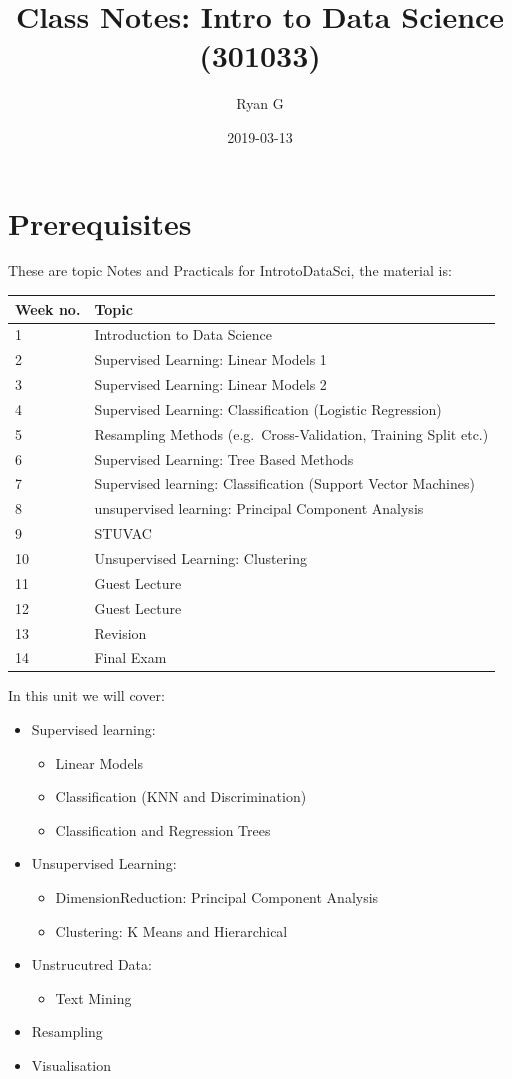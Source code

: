 \documentclass[]{book}
\title{Class Notes: Intro to Data Science (301033)}
\author{Ryan G}
\date{2019-03-13}
\providecommand{\tightlist}{%
  \setlength{\itemsep}{0pt}\setlength{\parskip}{0pt}}
\begin{document}
\maketitle

{
\setcounter{tocdepth}{1}
\tableofcontents
}
\chapter{Prerequisites}\label{prerequisites}

These are topic Notes and Practicals for IntrotoDataSci, the material
is:

\begin{longtable}[]{@{}ll@{}}
\toprule
Week no. & Topic\tabularnewline
\midrule
\endhead
1 & Introduction to Data Science\tabularnewline
2 & Supervised Learning: Linear Models 1\tabularnewline
3 & Supervised Learning: Linear Models 2\tabularnewline
4 & Supervised Learning: Classification (Logistic
Regression)\tabularnewline
5 & Resampling Methods (e.g.~Cross-Validation, Training Split
etc.)\tabularnewline
6 & Supervised Learning: Tree Based Methods\tabularnewline
7 & Supervised learning: Classification (Support Vector
Machines)\tabularnewline
8 & unsupervised learning: Principal Component Analysis\tabularnewline
9 & STUVAC\tabularnewline
10 & Unsupervised Learning: Clustering\tabularnewline
11 & Guest Lecture\tabularnewline
12 & Guest Lecture\tabularnewline
13 & Revision\tabularnewline
14 & Final Exam\tabularnewline
\bottomrule
\end{longtable}

In this unit we will cover:

\begin{itemize}
\tightlist
\item
  Supervised learning:

  \begin{itemize}
  \tightlist
  \item
    Linear Models
  \item
    Classification (KNN and Discrimination)
  \item
    Classification and Regression Trees
  \end{itemize}
\item
  Unsupervised Learning:

  \begin{itemize}
  \tightlist
  \item
    DimensionReduction: Principal Component Analysis
  \item
    Clustering: K Means and Hierarchical
  \end{itemize}
\item
  Unstrucutred Data:

  \begin{itemize}
  \tightlist
  \item
    Text Mining
  \end{itemize}
\item
  Resampling
\item
  Visualisation
\end{itemize}
\end{document}
